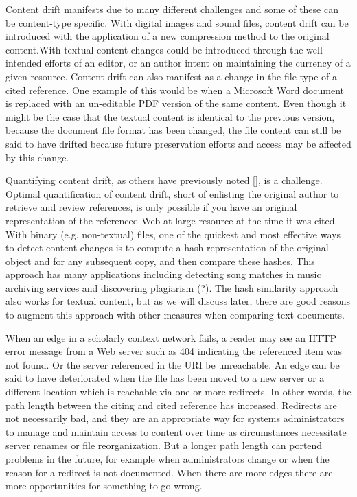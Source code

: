 \documentclass[12pt]{article}
\begin{document}
Content drift manifests due to many different challenges and some of these can be content-type specific. With digital images and sound files, content drift can be introduced with the application of a new compression method to the original content.With textual content changes could be introduced through the well-intended efforts of an editor, or an author intent on maintaining the currency of a given resource. Content drift can also manifest as a change in the file type of a cited reference. One example of this would be when a Microsoft Word document is replaced with an un-editable PDF version of the same content. Even though it might be the case that the textual content is identical to the previous version, because the document file format has been changed, the file content can still be said to have drifted because future preservation efforts and access may be affected by this change. 

Quantifying content drift, as others have previously noted [], is a challenge. Optimal quantification of content drift, short of enlisting the original author to retrieve and review references, is only possible if you have an original representation of the referenced Web at large resource at the time it was cited. With binary (e.g. non-textual) files, one of the quickest and most effective ways to detect content changes is to compute a hash representation of the original object and for any subsequent copy, and then compare these hashes. This approach has many applications including detecting song matches in music archiving services and discovering plagiarism (?). The hash similarity approach also works for textual content, but as we will discuss later, there are good reasons to augment this approach with other measures when comparing text documents. 

When an edge in a scholarly context network fails, a reader may see an HTTP error message from a Web server such as 404 indicating the referenced item was not found. Or the server referenced in the URI be unreachable. An edge can be said to have deteriorated when the file has been moved to a new server or a different location which is reachable via one or more redirects. In other words, the path length between the citing and cited reference has increased. Redirects are not necessarily bad, and they are an appropriate way for systems administrators to manage and maintain access to content over time as circumstances necessitate server renames or file reorganization. But a longer path length can portend problems in the future, for example when administrators change or when the reason for a redirect is not documented. When there are more edges there are more opportunities for something to go wrong.
\end{document}
